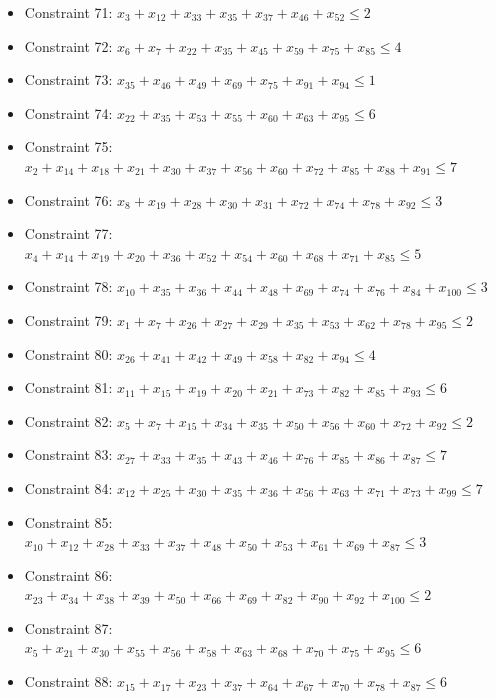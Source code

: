 \documentclass[11pt]{article}
\begin{document}
\begin{itemize}
\item Constraint 71: $x_{3} + x_{12} + x_{33} + x_{35} + x_{37} + x_{46} + x_{52} \le 2$
\item Constraint 72: $x_{6} + x_{7} + x_{22} + x_{35} + x_{45} + x_{59} + x_{75} + x_{85} \le 4$
\item Constraint 73: $x_{35} + x_{46} + x_{49} + x_{69} + x_{75} + x_{91} + x_{94} \le 1$
\item Constraint 74: $x_{22} + x_{35} + x_{53} + x_{55} + x_{60} + x_{63} + x_{95} \le 6$
\item Constraint 75: $x_{2} + x_{14} + x_{18} + x_{21} + x_{30} + x_{37} + x_{56} + x_{60} + x_{72} + x_{85} + x_{88} + x_{91} \le 7$
\item Constraint 76: $x_{8} + x_{19} + x_{28} + x_{30} + x_{31} + x_{72} + x_{74} + x_{78} + x_{92} \le 3$
\item Constraint 77: $x_{4} + x_{14} + x_{19} + x_{20} + x_{36} + x_{52} + x_{54} + x_{60} + x_{68} + x_{71} + x_{85} \le 5$
\item Constraint 78: $x_{10} + x_{35} + x_{36} + x_{44} + x_{48} + x_{69} + x_{74} + x_{76} + x_{84} + x_{100} \le 3$
\item Constraint 79: $x_{1} + x_{7} + x_{26} + x_{27} + x_{29} + x_{35} + x_{53} + x_{62} + x_{78} + x_{95} \le 2$
\item Constraint 80: $x_{26} + x_{41} + x_{42} + x_{49} + x_{58} + x_{82} + x_{94} \le 4$
\item Constraint 81: $x_{11} + x_{15} + x_{19} + x_{20} + x_{21} + x_{73} + x_{82} + x_{85} + x_{93} \le 6$
\item Constraint 82: $x_{5} + x_{7} + x_{15} + x_{34} + x_{35} + x_{50} + x_{56} + x_{60} + x_{72} + x_{92} \le 2$
\item Constraint 83: $x_{27} + x_{33} + x_{35} + x_{43} + x_{46} + x_{76} + x_{85} + x_{86} + x_{87} \le 7$
\item Constraint 84: $x_{12} + x_{25} + x_{30} + x_{35} + x_{36} + x_{56} + x_{63} + x_{71} + x_{73} + x_{99} \le 7$
\item Constraint 85: $x_{10} + x_{12} + x_{28} + x_{33} + x_{37} + x_{48} + x_{50} + x_{53} + x_{61} + x_{69} + x_{87} \le 3$
\item Constraint 86: $x_{23} + x_{34} + x_{38} + x_{39} + x_{50} + x_{66} + x_{69} + x_{82} + x_{90} + x_{92} + x_{100} \le 2$
\item Constraint 87: $x_{5} + x_{21} + x_{30} + x_{55} + x_{56} + x_{58} + x_{63} + x_{68} + x_{70} + x_{75} + x_{95} \le 6$
\item Constraint 88: $x_{15} + x_{17} + x_{23} + x_{37} + x_{64} + x_{67} + x_{70} + x_{78} + x_{87} \le 6$

\end{itemize}
\end{document}
